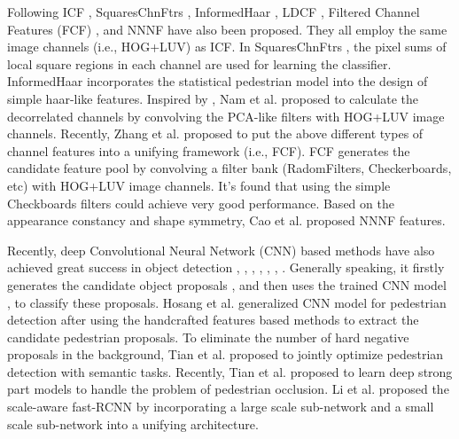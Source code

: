 \documentclass[journal]{IEEEtran}
\begin{document}
Following ICF \cite{Dollar_ICF_BMVC_2009}, SquaresChnFtrs \cite{Benenson_SquaresFtrs_CVPR_2013}, InformedHaar \cite{Zhang_InformedHaar_CVPR_2014}, LDCF \cite{Nam_LDCF_NIPS_2014}, Filtered Channel Features (FCF) \cite{Zhang_FCF_CVPR_2015}, and NNNF \cite{Cao_NNNF_arXiv_2015} have also been proposed. They all employ the same image channels (i.e., HOG+LUV) as ICF. In SquaresChnFtrs \cite{Benenson_SquaresFtrs_CVPR_2013}, the pixel sums of local square regions in each channel are used for learning the classifier. InformedHaar \cite{Zhang_InformedHaar_CVPR_2014} incorporates the statistical pedestrian model into the design of simple haar-like features. Inspired by \cite{Hariharan_DD_ECCV_2012}, Nam et al. \cite{Nam_LDCF_NIPS_2014} proposed to calculate the decorrelated channels by convolving the PCA-like \cite{Pang_LDA_TNNLS_2014} filters with HOG+LUV image channels. Recently, Zhang et al. \cite{Zhang_FCF_CVPR_2015} proposed to put the above different types of channel features into a unifying framework (i.e., FCF). FCF generates the candidate feature pool by convolving a filter bank (RadomFilters, Checkerboards, etc) with HOG+LUV image channels. It's found that using the simple Checkboards filters could achieve very good performance. Based on the appearance constancy and shape symmetry, Cao et al. \cite{Cao_NNNF_arXiv_2015} proposed NNNF features.

Recently, deep Convolutional Neural Network (CNN) based methods have also achieved great success in object detection \cite{Krizhevsky_AlexNet_NIPS_2012}, \cite{Girshick_RCNN_CVPR_2014}, \cite{Bell_IONet_arXiv_2015}, \cite{Ren_Faster_NIPS_2015}, \cite{Girshick_Fast_ICCV_2015}, \cite{Zhang_Cosaliency_TNNLS_2015}, \cite{Li_Lane_TNNLS_2016}. Generally speaking, it firstly generates the candidate object proposals \cite{Cheng_BING_CVPR_2014}, \cite{Uijlings_SS_IJCV_2013} and then uses the trained CNN model \cite{Krizhevsky_AlexNet_NIPS_2012}, \cite{Girshick_RCNN_CVPR_2014} to classify these proposals. Hosang et al. \cite{Hosang_Deeper_CVPR_2015} generalized CNN model for pedestrian detection after using the handcrafted features based methods to extract the candidate pedestrian proposals. To eliminate the number of hard negative proposals in the background, Tian et al. \cite{Tian_Tian_CVPR_2015} proposed to jointly optimize pedestrian detection with semantic tasks. Recently, Tian et al. \cite{Tian_DeepParts_ICCV_2015} proposed to learn deep strong part models to handle the problem of pedestrian occlusion. Li et al. \cite{Li_ScaleAware_arXiv_2015} proposed the scale-aware fast-RCNN by incorporating a large scale sub-network and a small scale sub-network into a unifying architecture.
\end{document}
